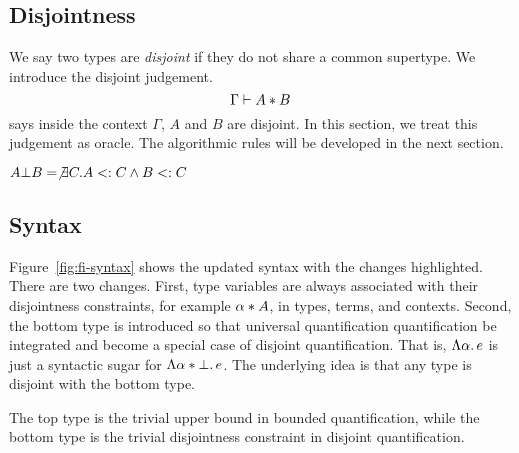 \subsection{Disjointness}

We say two types are \emph{disjoint} if they do not share a common supertype. We
introduce the disjoint judgement.
\[
\Gamma \vdash A * B
\]
says inside the context $\Gamma$, $A$ and $B$ are disjoint. In this section, we
treat this judgement as oracle. The algorithmic rules will be developed in the next section.

\begin{definition}[Disjointness]
  $A \bot B = \not \exists C. A <: C \wedge B <: C$
\end{definition}


\subsection{Syntax}

Figure~\ref{fig:fi-syntax} shows the updated syntax with the changes
highlighted. There are two changes. First, type variables are always associated
with their disjointness constraints, for example $\alpha * A$, in types,
terms, and contexts. Second, the bottom type is introduced so that universal
quantification quantification be integrated and become a special case of
disjoint quantification. That is, $\Lambda \alpha.\, e$ is just a syntactic sugar
for $\Lambda \alpha * \bot.\, e$. The underlying idea is that any type is
disjoint with the bottom type.

The top type is the trivial upper bound in bounded quantification, while the
bottom type is the trivial disjointness constraint in disjoint quantification.

